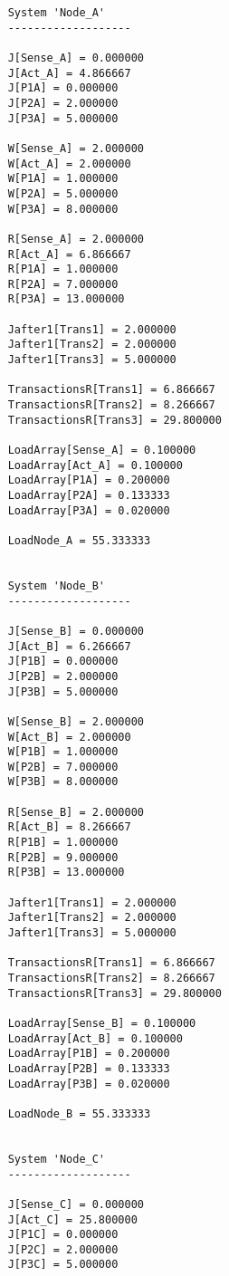 \begin{lstlisting}
    System 'Node_A'
    -------------------
    
    J[Sense_A] = 0.000000
    J[Act_A] = 4.866667
    J[P1A] = 0.000000
    J[P2A] = 2.000000
    J[P3A] = 5.000000
    
    W[Sense_A] = 2.000000
    W[Act_A] = 2.000000
    W[P1A] = 1.000000
    W[P2A] = 5.000000
    W[P3A] = 8.000000
    
    R[Sense_A] = 2.000000
    R[Act_A] = 6.866667
    R[P1A] = 1.000000
    R[P2A] = 7.000000
    R[P3A] = 13.000000
    
    Jafter1[Trans1] = 2.000000
    Jafter1[Trans2] = 2.000000
    Jafter1[Trans3] = 5.000000
    
    TransactionsR[Trans1] = 6.866667
    TransactionsR[Trans2] = 8.266667
    TransactionsR[Trans3] = 29.800000
    
    LoadArray[Sense_A] = 0.100000
    LoadArray[Act_A] = 0.100000
    LoadArray[P1A] = 0.200000
    LoadArray[P2A] = 0.133333
    LoadArray[P3A] = 0.020000
    
    LoadNode_A = 55.333333
    
    
    System 'Node_B'
    -------------------
    
    J[Sense_B] = 0.000000
    J[Act_B] = 6.266667
    J[P1B] = 0.000000
    J[P2B] = 2.000000
    J[P3B] = 5.000000
    
    W[Sense_B] = 2.000000
    W[Act_B] = 2.000000
    W[P1B] = 1.000000
    W[P2B] = 7.000000
    W[P3B] = 8.000000
    
    R[Sense_B] = 2.000000
    R[Act_B] = 8.266667
    R[P1B] = 1.000000
    R[P2B] = 9.000000
    R[P3B] = 13.000000
    
    Jafter1[Trans1] = 2.000000
    Jafter1[Trans2] = 2.000000
    Jafter1[Trans3] = 5.000000
    
    TransactionsR[Trans1] = 6.866667
    TransactionsR[Trans2] = 8.266667
    TransactionsR[Trans3] = 29.800000
    
    LoadArray[Sense_B] = 0.100000
    LoadArray[Act_B] = 0.100000
    LoadArray[P1B] = 0.200000
    LoadArray[P2B] = 0.133333
    LoadArray[P3B] = 0.020000
    
    LoadNode_B = 55.333333
    
    
    System 'Node_C'
    -------------------
    
    J[Sense_C] = 0.000000
    J[Act_C] = 25.800000
    J[P1C] = 0.000000
    J[P2C] = 2.000000
    J[P3C] = 5.000000
    

\end{lstlisting}
